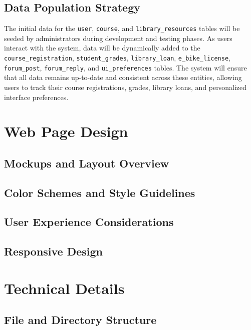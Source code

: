 \documentclass[12pt]{article}
\begin{document}
\subsection{Data Population Strategy}
The initial data for the \texttt{user}, \texttt{course}, and \texttt{library\_resources}
tables will be seeded by administrators during development and testing phases. As users
interact with the system, data will be dynamically added to the \texttt{course\_registration},
\texttt{student\_grades}, \texttt{library\_loan}, \texttt{e\_bike\_license}, \texttt{forum\_post},
\texttt{forum\_reply}, and \texttt{ui\_preferences} tables. The system will ensure that all data
remains up-to-date and consistent across these entities, allowing users to track their course
registrations, grades, library loans, and personalized interface preferences.

\newpage
\section{Web Page Design}
\subsection{Mockups and Layout Overview}
\subsection{Color Schemes and Style Guidelines}
\subsection{User Experience Considerations}
\subsection{Responsive Design}

\newpage
\section{Technical Details}
\subsection{File and Directory Structure}
\end{document}
